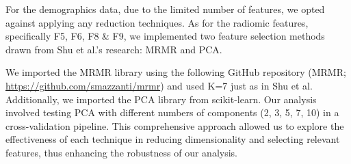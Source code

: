 For the demographics data, due to the limited number of features, we opted against applying any reduction techniques. As for the radiomic features, specifically 
F5, F6, F8 \& F9, we implemented two feature selection methods drawn from Shu et al.'s research: MRMR \cite{Ding_Peng} and PCA. 

We imported the MRMR library using the following GitHub repository (MRMR; \url{https://github.com/smazzanti/mrmr}) and used K=7 just as in Shu et al. 
Additionally, we imported the PCA library from scikit-learn. Our analysis involved testing PCA with different numbers of components (2, 3, 5, 7, 10) in 
a cross-validation pipeline. This comprehensive approach allowed us to explore the effectiveness of each technique in reducing dimensionality and selecting relevant 
features, thus enhancing the robustness of our analysis.